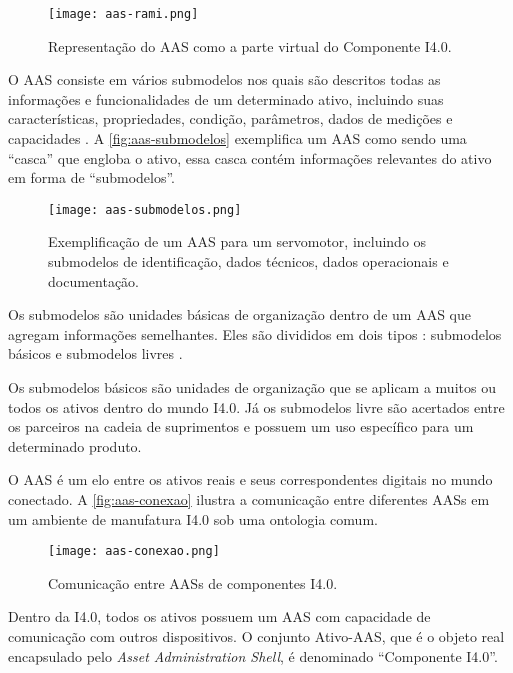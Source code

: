 	\begin{figure}[htb]
		\centering
		\caption{Representação do AAS como a parte virtual do Componente I4.0.}
		\label{fig:aas-rami}
		\texttt{[image: aas-rami.png]}
	\end{figure}
		
	O AAS consiste em vários submodelos nos quais são descritos todas as informações e funcionalidades de um determinado ativo, incluindo suas características, propriedades, condição, parâmetros, dados de medições e capacidades \cite{bader2019aas}. A \autoref{fig:aas-submodelos} exemplifica um AAS como sendo uma ``casca'' que engloba o ativo, essa casca contém informações relevantes do ativo em forma de ``submodelos''.
	
	\begin{figure}[htb]
		\centering
		\caption{Exemplificação de um AAS para um servomotor, incluindo os submodelos de identificação, dados técnicos, dados operacionais e documentação.}
		\label{fig:aas-submodelos}
		\texttt{[image: aas-submodelos.png]}
	\end{figure}

	Os submodelos são unidades básicas de organização dentro de um AAS que agregam informações semelhantes. Eles são divididos em dois tipos \cite{plattform2019detailsaas}: submodelos básicos e submodelos livres \cite{bader2019aas}.
	
	Os submodelos básicos são unidades de organização que se aplicam a muitos ou todos os ativos dentro do mundo I4.0. Já os submodelos livre são acertados entre os parceiros na cadeia de suprimentos e possuem um uso específico para um determinado produto.
	
	O AAS é um elo entre os ativos reais e seus correspondentes digitais no mundo conectado. A \autoref{fig:aas-conexao} ilustra a comunicação entre diferentes AASs em um ambiente de manufatura I4.0 sob uma ontologia comum.
	
	\begin{figure}[htb]
		\centering
		\caption{Comunicação entre AASs de componentes I4.0.}
		\label{fig:aas-conexao}
		\texttt{[image: aas-conexao.png]}
	\end{figure}

	Dentro da I4.0, todos os ativos possuem um AAS com capacidade de comunicação com outros dispositivos. O conjunto Ativo-AAS, que é o objeto real encapsulado pelo \textit{Asset Administration Shell}, é denominado ``Componente I4.0''.
	
